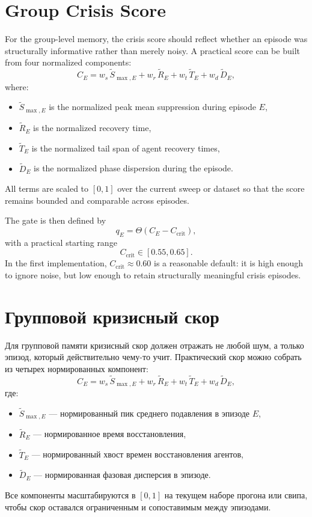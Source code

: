 \section{Group Crisis Score}
For the group-level memory, the crisis score should reflect whether an episode was structurally informative rather than merely noisy. A practical score can be built from four normalized components:
\begin{equation}
C_E = w_s\,\tilde S_{\max,E} + w_r\,\tilde R_E + w_t\,\tilde T_E + w_d\,\tilde D_E,
\end{equation}
where:
\begin{itemize}
    \item $\tilde S_{\max,E}$ is the normalized peak mean suppression during episode $E$,
    \item $\tilde R_E$ is the normalized recovery time,
    \item $\tilde T_E$ is the normalized tail span of agent recovery times,
    \item $\tilde D_E$ is the normalized phase dispersion during the episode.
\end{itemize}
All terms are scaled to $[0,1]$ over the current sweep or dataset so that the score remains bounded and comparable across episodes.

The gate is then defined by
\begin{equation}
q_E = \Theta(C_E - C_{\mathrm{crit}}),
\end{equation}
with a practical starting range
\begin{equation}
C_{\mathrm{crit}} \in [0.55, 0.65].
\end{equation}
In the first implementation, $C_{\mathrm{crit}} \approx 0.60$ is a reasonable default: it is high enough to ignore noise, but low enough to retain structurally meaningful crisis episodes.

\section{Групповой кризисный скор}
Для групповой памяти кризисный скор должен отражать не любой шум, а только эпизод, который действительно чему-то учит. Практический скор можно собрать из четырех нормированных компонент:
\begin{equation}
C_E = w_s\,\tilde S_{\max,E} + w_r\,\tilde R_E + w_t\,\tilde T_E + w_d\,\tilde D_E,
\end{equation}
где:
\begin{itemize}
    \item $\tilde S_{\max,E}$ — нормированный пик среднего подавления в эпизоде $E$,
    \item $\tilde R_E$ — нормированное время восстановления,
    \item $\tilde T_E$ — нормированный хвост времен восстановления агентов,
    \item $\tilde D_E$ — нормированная фазовая дисперсия в эпизоде.
\end{itemize}
Все компоненты масштабируются в $[0,1]$ на текущем наборе прогона или свипа, чтобы скор оставался ограниченным и сопоставимым между эпизодами.

